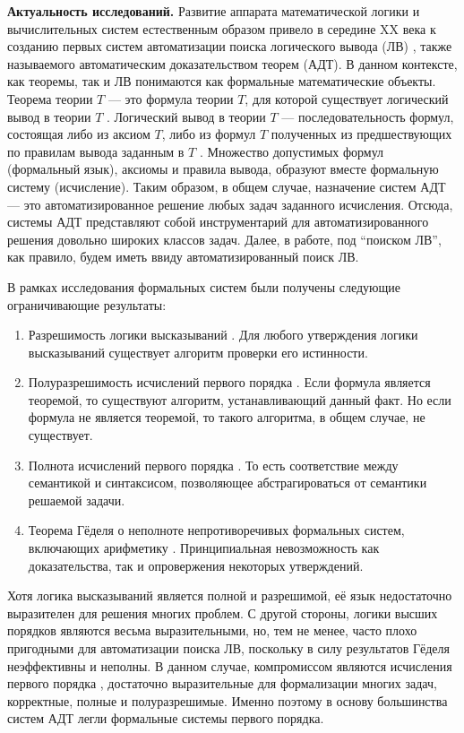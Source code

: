 \documentclass[a4paper]{report}
\begin{document}
\textbf{Актуальность исследований.}
Развитие аппарата математической логики и вычислительных систем естественным образом привело в середине XX века к созданию первых систем автоматизации поиска логического вывода (ЛВ) \cite{Newell1, Newell2, WangHao}, также называемого автоматическим доказательством теорем (АДТ). В данном контексте, как теоремы, так и ЛВ понимаются как формальные математические объекты. Теорема теории $T$ --- это формула теории $T$, для которой существует логический вывод в теории $T$ \cite{mendelson}. Логический вывод в теории $T$ --- последовательность формул, состоящая либо из аксиом $T$, либо из формул $T$ полученных из предшествующих по правилам вывода заданным в $T$ \cite{mendelson}. Множество допустимых формул (формальный язык), аксиомы и правила вывода, образуют вместе формальную систему (исчисление). Таким образом, в общем случае, назначение систем АДТ --- это автоматизированное решение любых задач заданного исчисления. Отсюда, системы АДТ представляют собой инструментарий для автоматизированного  решения довольно широких классов задач. Далее, в работе, под ``поиском ЛВ'', как правило, будем иметь ввиду автоматизированный поиск ЛВ.

В рамках исследования формальных систем были получены следующие ограничивающие результаты:
\begin{enumerate}
\item Разрешимость логики высказываний \cite{mendelson}. Для любого утверждения логики высказываний существует алгоритм проверки его истинности.
\item Полуразрешимость исчислений первого порядка \cite{turing}. Если формула является теоремой, то существуют алгоритм, устанавливающий данный факт. Но если формула не является теоремой, то такого алгоритма, в общем случае, не существует.
\item Полнота исчислений первого порядка \cite{Godel1}. То есть соответствие между семантикой и синтаксисом, позволяющее абстрагироваться от семантики решаемой задачи.
\item Теорема Гёделя о неполноте непротиворечивых формальных систем, включающих арифметику \cite{Godel2}. Принципиальная невозможность как доказательства, так и опровержения некоторых утверждений.
\end{enumerate}

Хотя логика высказываний является полной и разрешимой, её язык недостаточно выразителен для решения многих проблем. С другой стороны, логики высших порядков являются весьма выразительными, но, тем не менее, часто плохо пригодными для автоматизации поиска ЛВ, поскольку в силу результатов Гёделя неэффективны и неполны. В данном случае, компромиссом являются исчисления первого порядка \cite{Frege, Sourcebook, mendelson}, достаточно выразительные для формализации многих задач, корректные, полные и полуразрешимые. Именно поэтому в основу большинства систем АДТ легли формальные системы первого порядка.
\end{document}
